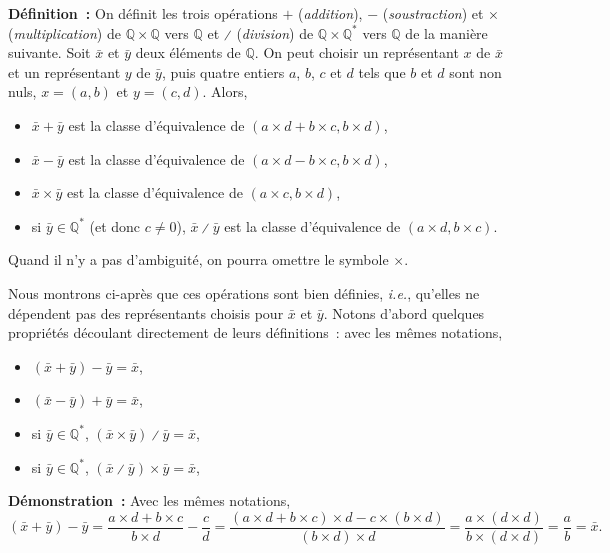 \noindent\textbf{Définition :} On définit les trois opérations $+$ (\emph{addition}), $-$ (\emph{soustraction}) et $\times$ (\emph{multiplication}) de $\mathbb{Q} \times \mathbb{Q}$ vers $\mathbb{Q}$ et $\divslash$ (\emph{division}) de $\mathbb{Q} \times \mathbb{Q}^*$ vers $\mathbb{Q}$ de la manière suivante.  
Soit $\bar{x}$ et $\bar{y}$ deux éléments de $\mathbb{Q}$. 
On peut choisir un représentant $x$ de $\bar{x}$ et un représentant $y$ de $\bar{y}$, puis quatre entiers $a$, $b$, $c$ et $d$ tels que $b$ et $d$ sont non nuls, $x = (a, b)$ et $y = (c, d)$.
Alors, 
\begin{itemize}[nosep]
    \item $\bar{x} + \bar{y}$ est la classe d'équivalence de $(a \times d + b \times c, b \times d)$,
    \item $\bar{x} - \bar{y}$ est la classe d'équivalence de $(a \times d - b \times c, b \times d)$,
    \item $\bar{x} \times \bar{y}$ est la classe d'équivalence de $(a \times c, b \times d)$,
    \item si $\bar{y} \in \mathbb{Q}^*$ (et donc $c \neq 0$), $\bar{x} \divslash \bar{y}$ est la classe d'équivalence de $(a \times d, b \times c)$.
\end{itemize}
Quand il n'y a pas d'ambiguité, on pourra omettre le symbole $\times$. 

\medskip

Nous montrons ci-après que ces opérations sont bien définies, \emph{i.e.}, qu'elles ne dépendent pas des représentants choisis pour $\bar{x}$ et $\bar{y}$.
Notons d'abord quelques propriétés découlant directement de leurs définitions : avec les mêmes notations, 
\begin{itemize}[nosep]
    \item $(\bar{x} + \bar{y}) - \bar{y} = \bar{x}$,
    \item $(\bar{x} - \bar{y}) + \bar{y} = \bar{x}$,
    \item si $\bar{y} \in \mathbb{Q}^*$, $(\bar{x} \times \bar{y}) \divslash \bar{y} = \bar{x}$,
    \item si $\bar{y} \in \mathbb{Q}^*$, $(\bar{x} \divslash \bar{y}) \times \bar{y} = \bar{x}$,
\end{itemize}

\medskip

\noindent\textbf{Démonstration :} Avec les mêmes notations, 
\begin{equation*}
    (\bar{x} + \bar{y}) - \bar{y} 
        = \frac{a \times d + b \times c}{b \times d} - \frac{c}{d}
        = \frac{(a \times d + b \times c) \times d - c \times (b \times d)}{(b \times d) \times d}
        = \frac{a \times (d \times d)}{b \times (d \times d)}
        = \frac{a}{b} 
        = \bar{x}.
\end{equation*}


